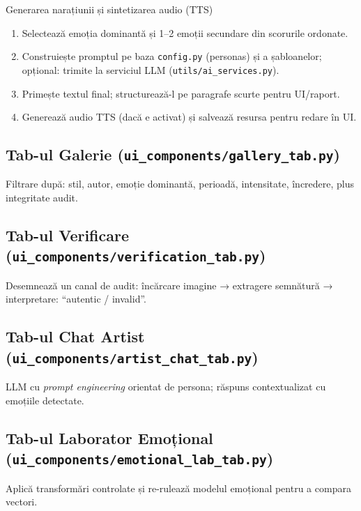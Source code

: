 \begin{algorithm}[H]
\caption{Generarea narațiunii și sintetizarea audio (TTS)}
\label{alg:c5-narrative-tts}
\begin{enumerate}
  \item Selectează emoția dominantă și 1--2 emoții secundare din scorurile ordonate.
  \item Construiește promptul pe baza \texttt{config.py} (personas) și a șabloanelor; opțional: trimite la serviciul LLM (\texttt{utils/ai\_services.py}).
  \item Primește textul final; structurează-l pe paragrafe scurte pentru UI/raport.
  \item Generează audio TTS (dacă e activat) și salvează resursa pentru redare în UI.
\end{enumerate}
\end{algorithm}

\subsection{Tab-ul Galerie (\texttt{ui\_components/gallery\_tab.py})}
Filtrare după: stil, autor, emoție dominantă, perioadă, intensitate, încredere, plus integritate audit.

\subsection{Tab-ul Verificare (\texttt{ui\_components/verification\_tab.py})}
Desemnează un canal de audit: încărcare imagine → extragere semnătură → interpretare: “autentic / invalid”.

\subsection{Tab-ul Chat Artist (\texttt{ui\_components/artist\_chat\_tab.py})}
LLM cu \emph{prompt engineering} orientat de persona; răspuns contextualizat cu emoțiile detectate.

\subsection{Tab-ul Laborator Emoțional (\texttt{ui\_components/emotional\_lab\_tab.py})}
Aplică transformări controlate și re-rulează modelul emoțional pentru a compara vectori.

